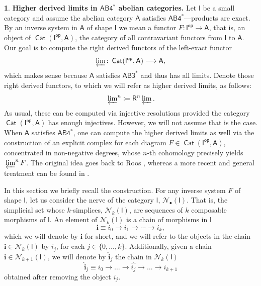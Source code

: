 \documentclass[reqno,11pt]{amsart}
\theoremstyle{plain}
\theoremstyle{remark}
\theoremstyle{definition}
\newtheorem{cosa}[thm]{}
\numberwithin{equation}{thm}
\newcommand{\CN}{\mathcal{N}}
\newcommand{\SA}{\mathsf{A}}
\newcommand{\SI}{\mathsf{I}}
\newcommand{\SR}{\mathsf{R}}
\newcommand{\lto}{\longrightarrow}
\newcommand{\op}{\mathsf{op}}
\DeclareMathOperator{\cat}{\mathsf{Cat}}
\begin{document}
	\begin{cosa}\label{higher-derived-limits}
		\textbf{Higher derived limits in $\mathsf{AB4^*}$ abelian categories.}
		Let $\SI$ be a small category and assume the abelian category $\SA$ satisfies $\mathsf{AB4^*}$---products are exact. By an inverse system in $\SA$ of shape $\SI$ we mean a functor $F \colon \SI^\op \to \SA$, that is, an object of $\cat(\SI^\op, \SA)$, the category of all contravariant functors from $\SI$ to $\SA$. Our goal is to compute the right derived functors of the left-exact functor
		\[ 
			\varprojlim \colon \cat(\SI^\op, \SA) \lto \SA,
		\]
		which makes sense because $\SA$ satisfies $\mathsf{AB3^*}$ and thus has all limits. Denote those right derived functors, to which we will refer as higher derived limits, as follows:
		\[ 
			\sideset{}{^{n}}\varprojlim \coloneqq \SR^n \varprojlim.
		\]
		As usual, these can be computed via injective resolutions provided the category $\cat(\SI^\op, \SA)$ has enough injectives. However, we will not assume that is the case. When $\SA$ satisfies $\mathsf{AB4^*}$, one can compute the higher derived limits as well via the construction of an explicit complex for each diagram $F \in \cat(\SI^\op, \SA)$, concentrated in non-negative degrees, whose $n$-th cohomology precisely yields $\sideset{}{^{n}}\varprojlim F$. The original idea goes back to Roos \cite{roos-1958}, whereas a more recent and general treatment can be found in \cite[A.3.]{Ntc}. 
		
		In this section we briefly recall the construction. For any inverse system $F$ of shape $\SI$, let us consider the nerve of the category $\SI$, $\CN_\bullet(\SI)$. That is, the simplicial set whose $k$-simplices, $\CN_k(\SI)$, are sequences of $k$ composable morphisms of $\SI$. An element of $\CN_k(\SI)$ is a chain of morphisms in $\SI$
		\[
			\textbf{i} \equiv i_0 \lto i_1 \lto \cdots \lto i_k,
		\]
		which we will denote by $\textbf{i}$ for short, and we will refer to the objects in the chain $\textbf{i} \in \CN_k(\SI)$ by $i_j$, for each $j \in \{0,\dots,k\}$. Additionally, given a chain $\textbf{i} \in \CN_{k+1}(\SI)$, we will denote by $\widehat{\textbf{i}}_j$ the chain in $\CN_{k}(\SI)$
		\[
			\widehat{\textbf{i}}_j \equiv i_0 \to \dots \to \widehat{i_j} \to \dots \to i_{k+1} 
		\] obtained after removing the object $i_j$.
		

\end{cosa}
\end{document}

